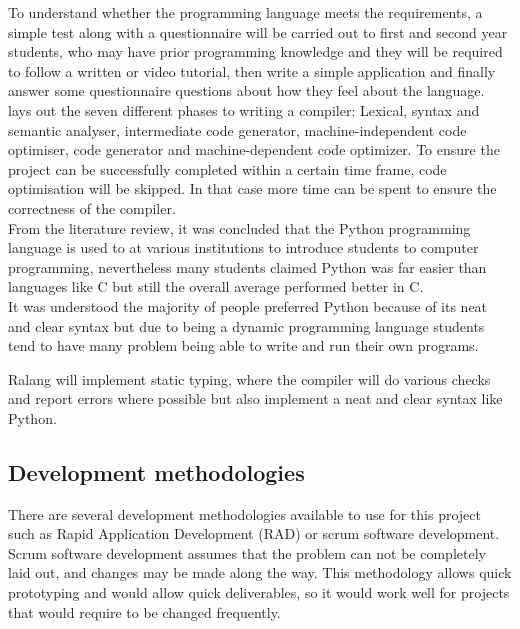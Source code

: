 \documentclass[a4paper]{article}
\begin{document}
To understand whether the programming language meets the requirements, a simple test along with a questionnaire will be carried out to first and second year students, who may have prior programming knowledge and they will be required to follow a written or video tutorial, then write a simple application and finally answer some questionnaire questions about how they feel about the language.\\

\textcite{AhoLamSethiUllman2006} lays out the seven different phases to writing a compiler: Lexical, syntax and semantic analyser, intermediate code generator, machine-independent code optimiser, code generator and machine-dependent code optimizer. To ensure the project can be successfully completed within a certain time frame, code optimisation will be skipped. In that case more time can be spent to ensure the correctness of the compiler.\\

From the literature review, it was concluded that the Python programming language is used to at various institutions to introduce students to computer programming, nevertheless many students claimed Python was far easier than languages like C but still the overall average performed better in C. \parencite{KrpanBilobrk2011}\\

It was understood the majority of people preferred Python because of its neat and clear syntax but due to being a dynamic programming language students tend to have many problem being able to write and run their own programs.

Ralang will implement static typing, where the compiler will do various checks and report errors where possible but also implement a neat and clear syntax like Python.

\subsection{Development methodologies}
There are several development methodologies available to use for this project such as Rapid Application Development (RAD) or scrum software development.\\

Scrum software development assumes that the problem can not be completely laid out, and changes may be made along the way. This methodology allows quick prototyping and would allow quick deliverables, so it would work well for projects that would require to be changed frequently.
\end{document}
